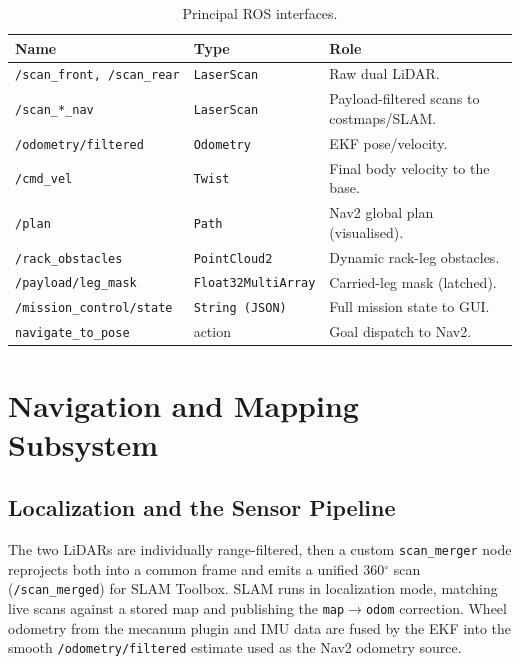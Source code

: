\documentclass[11pt,a4paper]{article}
\newcommand{\code}[1]{\texttt{\small #1}}
\begin{document}
\begin{table}[h]\centering\small
\caption{Principal ROS interfaces.}\label{tab:topics}
\begin{tabular}{@{}llp{6.8cm}@{}}
\toprule
\textbf{Name} & \textbf{Type} & \textbf{Role}\\
\midrule
\code{/scan\_front,\,/scan\_rear} & \code{LaserScan} & Raw dual LiDAR.\\
\code{/scan\_*\_nav} & \code{LaserScan} & Payload-filtered scans to costmaps/SLAM.\\
\code{/odometry/filtered} & \code{Odometry} & EKF pose/velocity.\\
\code{/cmd\_vel} & \code{Twist} & Final body velocity to the base.\\
\code{/plan} & \code{Path} & Nav2 global plan (visualised).\\
\code{/rack\_obstacles} & \code{PointCloud2} & Dynamic rack-leg obstacles.\\
\code{/payload/leg\_mask} & \code{Float32MultiArray} & Carried-leg mask (latched).\\
\code{/mission\_control/state} & \code{String\,(JSON)} & Full mission state to GUI.\\
\code{navigate\_to\_pose} & action & Goal dispatch to Nav2.\\
\bottomrule
\end{tabular}
\end{table}

\section{Navigation and Mapping Subsystem}\label{sec:nav}
\subsection{Localization and the Sensor Pipeline}
The two LiDARs are individually range-filtered, then a custom
\code{scan\_merger} node reprojects both into a common frame and emits a
unified 360$^\circ$ scan (\code{/scan\_merged}) for SLAM Toolbox. SLAM runs in
localization mode, matching live scans against a stored map and publishing
the \code{map}$\rightarrow$\code{odom} correction. Wheel odometry from the
mecanum plugin and IMU data are fused by the EKF into the smooth
\code{/odometry/filtered} estimate used as the Nav2 odometry source.
\end{document}
